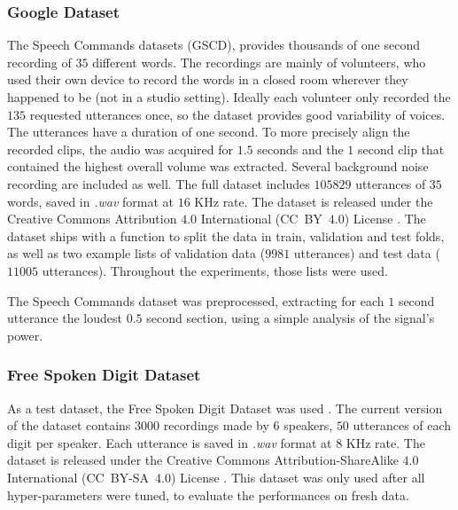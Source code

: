 \subsubsection{Google Dataset}


The Speech Commands datasets \cite{warden2018speech} (GSCD), provides thousands
of one second recording of $35$ different words. The recordings are mainly of
volunteers, who used their own device to record the words in a closed room
wherever they happened to be (not in a studio setting). Ideally each volunteer
only recorded the $135$ requested utterances once, so the dataset provides good
variability of voices.
The utterances have a duration of one second.
To more precisely align the recorded clips, the audio was acquired for $1.5$
seconds and the $1$ second clip that contained the highest overall volume was
extracted.
Several background noise recording are included as well.
The full dataset includes $105829$ utterances of $35$ words, saved in
\textit{.wav} format at $16$ KHz rate.
The dataset is released under the Creative Commons Attribution $4.0$
International (CC~BY~$4.0$) License \cite{ccby4}.
The dataset ships with a function to split the data in train, validation and
test folds, as well as two example lists of validation data ($9981$ utterances)
and test data ($11005$ utterances).
Throughout the experiments, those lists were used.

The Speech Commands dataset was preprocessed, extracting for each $1$ second
utterance the loudest $0.5$ second section, using a simple analysis of the
signal's power.


\subsubsection{Free Spoken Digit Dataset}

As a test dataset, the Free Spoken Digit Dataset was used
\cite{zohar_jackson_2018_1342401}.
The current version of the dataset contains $3000$ recordings made by $6$
speakers, $50$ utterances of each digit per speaker.
Each utterance is saved in \textit{.wav} format at $8$ KHz rate.
The dataset is released under the Creative Commons 
Attribution-ShareAlike $4.0$ International (CC~BY-SA~$4.0$)
License \cite{ccbysa4}.
This dataset was only used after all hyper-parameters were tuned, to evaluate
the performances on fresh data.

